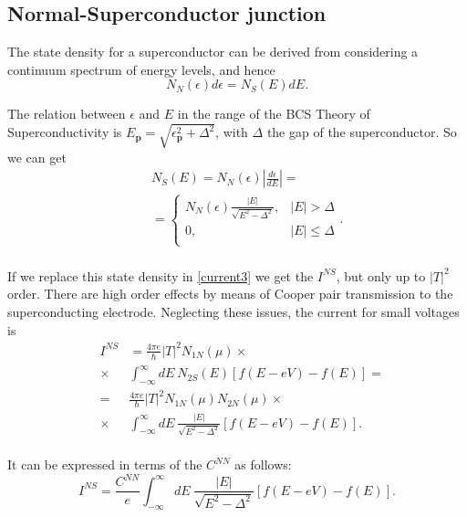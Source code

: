 \subsection{Normal-Superconductor junction} 
The state density for a superconductor can be derived from considering a continuum spectrum of energy levels, and hence
\begin{equation}
N_N(\epsilon) d\epsilon = N_S(E)dE.
\end{equation}

The relation between $\epsilon$ and $E$ in the range of the BCS Theory of Superconductivity is $E_{\mathbf{p}} = \sqrt{\epsilon_{\mathbf{p}}^2 + \Delta^2}$, with $\Delta$ the gap of the superconductor. So we can get
\begin{eqnarray}\label{ns}
&&N_S(E) = N_N(\epsilon) \left | \frac{d\epsilon}{dE} \right | = 
	\nonumber \\
&& = \left\{ 
\begin{array}{ll} 
N_N(\epsilon)\frac{|E|}{\sqrt{E^2-\Delta^2}},	&	|E| > \Delta 	\\ 
0,								& 	|E| \leq \Delta	\\
\end{array}
\right..
	\nonumber \\
\end{eqnarray}

If we replace this state density in \eqref{current3} we get the $I^{NS}$, but only up to $|T|^2$ order. There are high order effects by means of Cooper pair transmission to the superconducting electrode. Neglecting these issues, the current for small voltages is
\begin{eqnarray}\label{ins_previous}
&I^{NS}& = \frac{4\pi e}{\hbar} |T|^2 N_{1N}(\mu) \times
		\nonumber \\
		&\times& \int_{-\infty}^{\infty} dE\ N_{2S}(E) [f(E-eV)-f(E)] =
		\nonumber \\
		&=& \frac{4\pi e}{\hbar} |T|^2 N_{1N}(\mu) N_{2N}(\mu) \times
		\nonumber \\
		&\times& \int_{-\infty}^{\infty} dE\ \frac{|E|}{\sqrt{E^2-\Delta^2}} [f(E-eV)-f(E)].
		\nonumber \\
\end{eqnarray}

It can be expressed in terms of the $C^{NN}$ as follows:
\begin{equation}\label{ins}
I^{NS} = \frac{C^{NN}}{e} \int_{-\infty}^{\infty} dE\ \frac{|E|}{\sqrt{E^2-\Delta^2}} [f(E-eV)-f(E)].
\end{equation}


